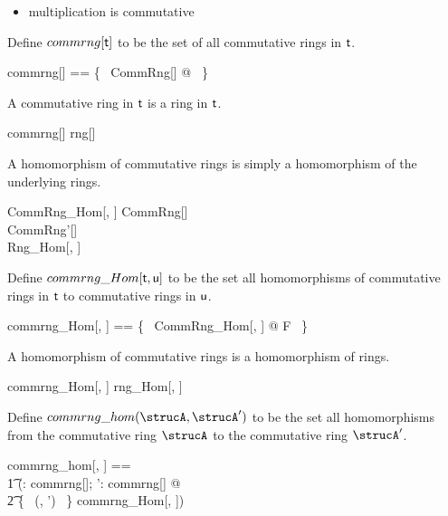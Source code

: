 \documentclass{amsart}
\begin{document}
\begin{itemize}
	\item multiplication is commutative
\end{itemize}

Define $commrng[\mathsf{t}]$ to be the set of all commutative rings in $\mathsf{t}$.

\begin{zed}
	commrng[\genT] == \{~ CommRng[\genT] @ \strucA ~\}
\end{zed}

\begin{remark}
A commutative ring in $\mathsf{t}$ is a ring in $\mathsf{t}$.

\begin{zed}
	commrng[\setT] \subseteq rng[\setT]
\end{zed}

\end{remark}

A homomorphism of commutative rings is simply a homomorphism of the underlying rings.

\begin{schema}{CommRng\_Hom}[\genT, \genU]
	CommRng[\genT] \\
	CommRng'[\genU] \\
	Rng\_Hom[\genT, \genU]
\end{schema}

Define $commrng\_Hom[\mathsf{t}, \mathsf{u}]$ to be the set all homomorphisms of commutative rings
in $\mathsf{t}$ to commutative rings in $\mathsf{u}$.

\begin{zed}
	commrng\_Hom[\genT, \genU] == \{~ CommRng\_Hom[\genT, \genU] @ F ~\}
\end{zed}

\begin{remark}
A homomorphism of commutative rings is a homomorphism of rings.

\begin{zed}
	commrng\_Hom[\setT, \setU] \subseteq rng\_Hom[\setT, \setU]
\end{zed}

\end{remark}

Define $commrng\_hom(\strucA, \strucA')$ to be the set all homomorphisms from the commutative ring
$\strucA$ to the commutative ring $\strucA'$.

\begin{zed}
	commrng\_hom[\genT, \genU] == \\
	\t1	(\lambda \strucA: commrng[\genT]; \strucA': commrng[\genU] @ \\
	\t2		\{~ (\strucA, \strucA') ~\} \dres commrng\_Hom[\genT, \genU])
\end{zed}
\end{document}
